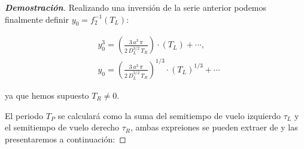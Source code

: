 \documentclass[12pt,a4paper]{report} %
\begin{document}
\begin{proof}[\textbf{Demostración}]
	\noindent Realizando una inversión de la serie  anterior podemos finalmente definir $y_0=f_2^{-1}(T_L)$:
	
	\begin{equation}
		\label{eq:macla4}
		\begin{aligned}
		&y_0^3= \left( \frac{3\, a^3 \, \pi}{2\, D_L^{3/2}\, T_R} \right)\cdot \left(T_L\right)+\cdots,\\[3mm]
		&y_0= \left( \frac{3\, a^3 \, \pi}{2\, D_L^{3/2}\, T_R} \right)^{1/3}\cdot \left(T_L\right)^{1/3}+\cdots
	\end{aligned}
	\end{equation}\smallskip
	
	\noindent ya que hemos supuesto $T_R\neq0$.
	

	\vspace{0.5cm} El periodo $T_P$ se calculará como la suma del semitiempo de vuelo izquierdo $\tau_L$ y el semitiempo de vuelo derecho $\tau_R$, ambas expreiones se pueden extraer de \cite{caracterizacion} y las presentaremos a continuación:
		

\end{proof}
\end{document}
